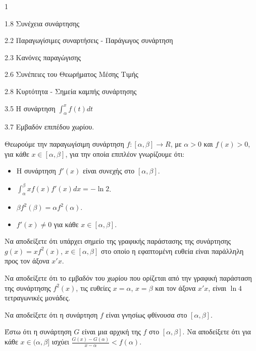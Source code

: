 \begin{ylh}{1}
    \item 1.8 Συνέχεια συνάρτησης
    \item 2.2 Παραγωγίσιμες συναρτήσεις - Παράγωγος συνάρτηση
    \item 2.3 Κανόνες παραγώγισης
    \item 2.6 Συνέπειες του Θεωρήματος Μέσης Τιμής
    \item 2.8 Κυρτότητα - Σημεία καμπής συνάρτησης
    \item 3.5 Η συνάρτηση $\int_{\alpha}^{x} f(t)dt$
    \item 3.7 Εμβαδόν επιπέδου χωρίου.
\end{ylh}
Θεωρούμε την παραγωγίσιμη συνάρτηση $f:[\alpha, \beta] \to R$, με $\alpha > 0$ και $f(x) > 0$, για κάθε $x \in [\alpha, \beta]$, για την οποία επιπλέον γνωρίζουμε ότι:
\begin{itemize}
    \item Η συνάρτηση $f'(x)$ είναι συνεχής στο $[\alpha, \beta]$.
    \item $\int_{\alpha}^{\beta} xf(x)f'(x)dx = -\ln2$.
    \item $\beta f^2(\beta) = \alpha f^2(\alpha)$.
    \item $f'(x) \neq 0$ για κάθε $x \in [\alpha, \beta]$.
\end{itemize}
\begin{alist}
    \item Να αποδείξετε ότι υπάρχει σημείο της γραφικής παράστασης της συνάρτησης $g(x) = xf^2(x)$, $x \in [\alpha, \beta]$ στο οποίο η εφαπτομένη ευθεία είναι παράλληλη προς τον άξονα $x'x$. 
    \item Να αποδείξετε ότι το εμβαδόν του χωρίου που ορίζεται από την γραφική παράσταση της συνάρτησης $f^2(x)$, τις ευθείες $x = \alpha$, $x = \beta$ και τον άξονα $x'x$, είναι $\ln4$ τετραγωνικές μονάδες. 
    \item Να αποδείξετε ότι η συνάρτηση $f$ είναι γνησίως φθίνουσα στο $[\alpha, \beta]$. 
    \item Έστω ότι η συνάρτηση $G$ είναι μια αρχική της $f$ στο $[\alpha, \beta]$. Να αποδείξετε ότι για κάθε $x \in (\alpha, \beta]$ ισχύει $\frac{G(x)-G(\alpha)}{x-\alpha} < f(\alpha)$. 
\end{alist}